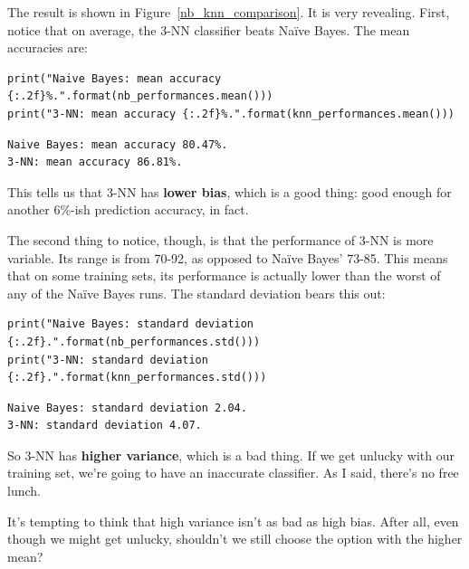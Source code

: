 The result is shown in Figure~\ref{nb_knn_comparison}. It is very revealing.
First, notice that on average, the 3-NN classifier beats Na\"{i}ve Bayes. The
mean accuracies are:

\begin{Verbatim}[fontsize=\footnotesize,samepage=true,frame=single,framesep=3mm]
print("Naive Bayes: mean accuracy {:.2f}%.".format(nb_performances.mean()))
print("3-NN: mean accuracy {:.2f}%.".format(knn_performances.mean()))
\end{Verbatim}
\vspace{-.2in}

\begin{Verbatim}[fontsize=\footnotesize,samepage=true,frame=leftline,framesep=5mm,framerule=1mm]
Naive Bayes: mean accuracy 80.47%.
3-NN: mean accuracy 86.81%.
\end{Verbatim}

This tells us that 3-NN has \textbf{lower bias}, which is a good thing: good
enough for another 6\%-ish prediction accuracy, in fact.

The second thing to notice, though, is that the performance of 3-NN is more
variable. Its range is from 70-92, as opposed to Na\"{i}ve Bayes' 73-85. This
means that on some training sets, its performance is actually lower than the
worst of any of the Na\"{i}ve Bayes runs. The standard deviation bears this
out:

\begin{Verbatim}[fontsize=\footnotesize,samepage=true,frame=single,framesep=3mm]
print("Naive Bayes: standard deviation {:.2f}.".format(nb_performances.std()))
print("3-NN: standard deviation {:.2f}.".format(knn_performances.std()))
\end{Verbatim}
\vspace{-.2in}

\begin{Verbatim}[fontsize=\footnotesize,samepage=true,frame=leftline,framesep=5mm,framerule=1mm]
Naive Bayes: standard deviation 2.04.
3-NN: standard deviation 4.07.
\end{Verbatim}


So 3-NN has \textbf{higher variance}, which is a bad thing. If we get unlucky
with our training set, we're going to have an inaccurate classifier. As I said,
there's no free lunch.

\bigskip

It's tempting to think that high variance isn't as bad as high bias. After all,
even though we might get unlucky, shouldn't we still choose the option with the
higher mean?

